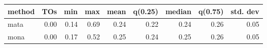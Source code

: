 \begin{tabular}{lrrrrrrrr}
\hline
 method   &   TOs &   min &   max &   mean &   q(0.25) &   median &   q(0.75) &   std. dev \\
\hline
 mata     &  0.00 &  0.14 &  0.69 &   0.24 &      0.22 &     0.24 &      0.26 &       0.05 \\
 mona     &  0.00 &  0.17 &  0.52 &   0.25 &      0.24 &     0.25 &      0.26 &       0.05 \\
\hline
\end{tabular}
